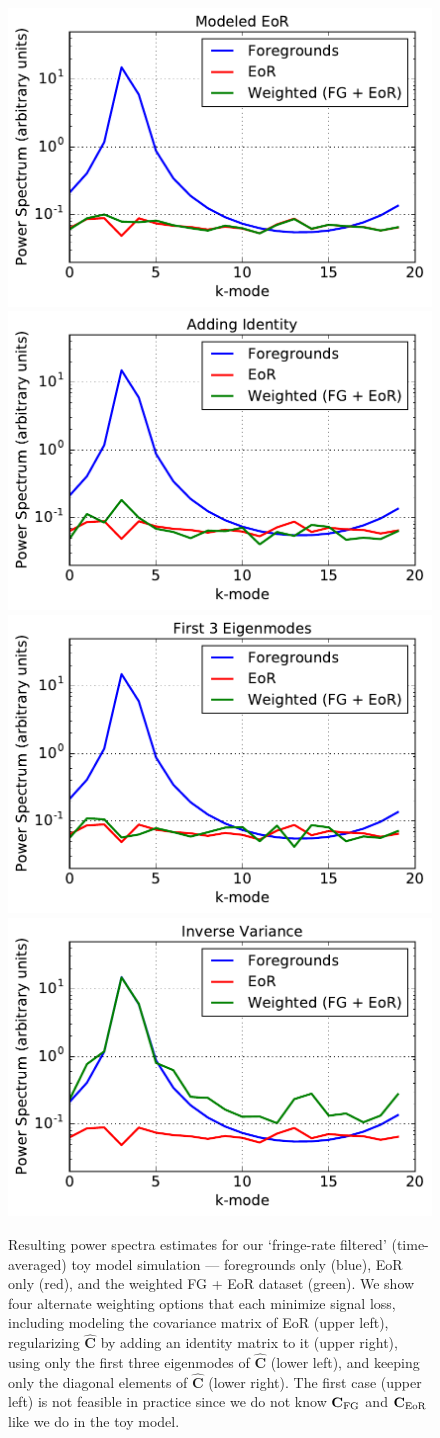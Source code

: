 \documentclass[preprint2,numberedappendix,tighten]{aastex6}  %
\begin{document}
\begin{figure}
	\centering
	\includegraphics[trim={0cm 0cm 0cm 0cm},clip,height=0.3\textwidth]{plots/toy_sigloss10.pdf}
	\includegraphics[trim={0cm 0cm 0cm 0cm},clip,height=0.3\textwidth]{plots/toy_sigloss8.pdf}
	\includegraphics[trim={0cm 0cm 0cm 0cm},clip,height=0.3\textwidth]{plots/toy_sigloss9.pdf}
	\includegraphics[trim={0cm 0cm 0cm 0cm},clip,height=0.3\textwidth]{plots/toy_sigloss11.pdf}
	\caption{Resulting power spectra estimates for our `fringe-rate filtered' (time-averaged) toy model simulation --- foregrounds only (blue), 
EoR only (red), and the weighted FG + EoR dataset (green). We show four alternate weighting options that each minimize signal 
loss, including modeling the covariance matrix of EoR (upper left), regularizing $\widehat{\textbf{C}}$ by adding an identity matrix to 
it (upper right), using only the first three eigenmodes of $\widehat{\textbf{C}}$ (lower left), and keeping only the diagonal elements of 
$\widehat{\textbf{C}}$ (lower right). The first case (upper left) is not feasible in practice since we do not know $\textbf{C}_{\rm FG}$ and $\textbf{C}_{\rm EoR}$ like we do in the toy model.}
	\label{fig:toy_sigloss8}
\end{figure}
\end{document}
